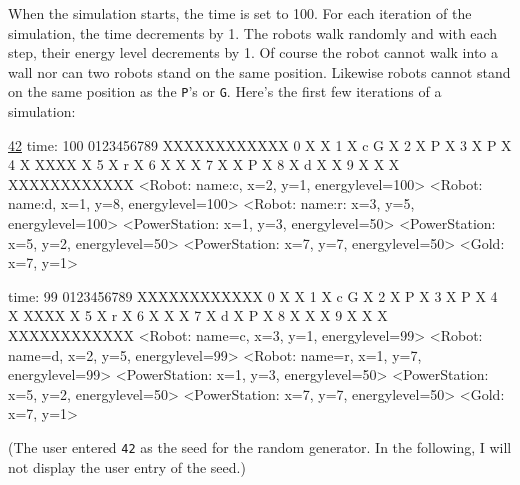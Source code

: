 When the simulation starts, the time is set to 100.
For each iteration of the simulation, the time decrements by 1.
The robots walk randomly and with each step, their energy level decrements by
1.
Of course the robot cannot walk into a wall nor can two robots stand
on the same position.
Likewise robots cannot stand on the same position as the \verb!P!'s or
\verb!G!.
Here's the first few iterations of a simulation:
{\small
\begin{console}[commandchars=\\\{\}]
\underline{42}
time: 100
   0123456789
  XXXXXXXXXXXX
0 X          X
1 X  c    G  X
2 X     P    X
3 X P        X
4 X   XXXX   X
5 X   r      X
6 X   X      X
7 X   X   P  X
8 X d X      X
9 X   X      X
  XXXXXXXXXXXX
<Robot: name:c, x=2, y=1, energylevel=100>
<Robot: name:d, x=1, y=8, energylevel=100>
<Robot: name:r: x=3, y=5, energylevel=100>
<PowerStation: x=1, y=3, energylevel=50>
<PowerStation: x=5, y=2, energylevel=50>
<PowerStation: x=7, y=7, energylevel=50>
<Gold: x=7, y=1>

time: 99
   0123456789
  XXXXXXXXXXXX
0 X          X
1 X   c   G  X
2 X     P    X
3 X P        X
4 X   XXXX   X
5 X  r       X
6 X   X      X
7 X d X   P  X
8 X   X      X
9 X   X      X
  XXXXXXXXXXXX
<Robot: name=c, x=3, y=1, energylevel=99>
<Robot: name=d, x=2, y=5, energylevel=99>
<Robot: name=r, x=1, y=7, energylevel=99>
<PowerStation: x=1, y=3, energylevel=50>
<PowerStation: x=5, y=2, energylevel=50>
<PowerStation: x=7, y=7, energylevel=50>
<Gold: x=7, y=1>
\end{console}
}
(The user entered \verb!42! as the seed for the random generator.
In the following, I will not display the user entry of the seed.)


